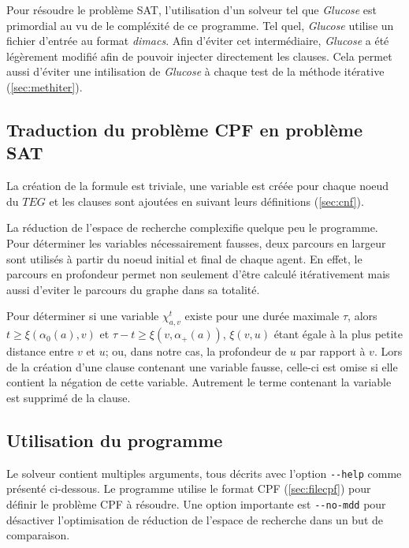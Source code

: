 \documentclass[french, 12pt, letterpaper]{article}
\theoremstyle{definition}
\theoremstyle{proposition}
\theoremstyle{example}
\begin{document}
    Pour résoudre le problème SAT, l'utilisation d'un solveur tel que \emph{Glucose} est primordial au vu de le compléxité de ce programme.
    Tel quel, \emph{Glucose} utilise un fichier d'entrée au format \emph{dimacs}.
    Afin d'éviter cet intermédiaire, \emph{Glucose} a été 
    légèrement modifié afin de pouvoir injecter directement les clauses.
    Cela permet aussi d'éviter une intilisation de \emph{Glucose} à chaque test de la méthode itérative (\ref{sec:methiter}).

    \subsection{Traduction du problème CPF en problème SAT}

    La création de la formule est triviale, une variable est créée pour chaque noeud du $TEG$ et les clauses sont ajoutées en
    suivant leurs définitions (\ref{sec:cnf}).

    La réduction de l'espace de recherche complexifie quelque peu le programme. 
    Pour déterminer les variables nécessairement fausses, deux parcours en largeur sont utilisés à partir
    du noeud initial et final de chaque agent.
    En effet, le parcours en profondeur permet non seulement d'être calculé itérativement mais aussi d'eviter le parcours du graphe dans sa totalité.

    Pour déterminer si une variable $\chi^t_{a, v}$ existe pour une durée maximale $\tau$, alors $t \ge \xi(\alpha_0(a), v)$ et
    $\tau - t \ge \xi(v, \alpha_+(a))$, $\xi(v, u)$ étant égale à la plus petite distance entre $v$ et $u$; ou, dans notre cas,
    la profondeur de $u$  par rapport à $v$. 
    Lors de la création d'une clause contenant une variable fausse, celle-ci est omise si elle contient la négation de cette variable.
    Autrement le terme contenant la variable est supprimé de la clause.


    \subsection{Utilisation du programme}

    Le solveur contient multiples arguments, tous décrits avec l'option \lstinline{--help} comme présenté ci-dessous.
    Le programme utilise le format CPF (\ref{sec:filecpf}) pour définir le problème CPF à résoudre. 
    Une option importante est \lstinline{--no-mdd} pour désactiver l'optimisation de réduction de l'espace de recherche dans un but de 
    comparaison. 
    
\end{document}
